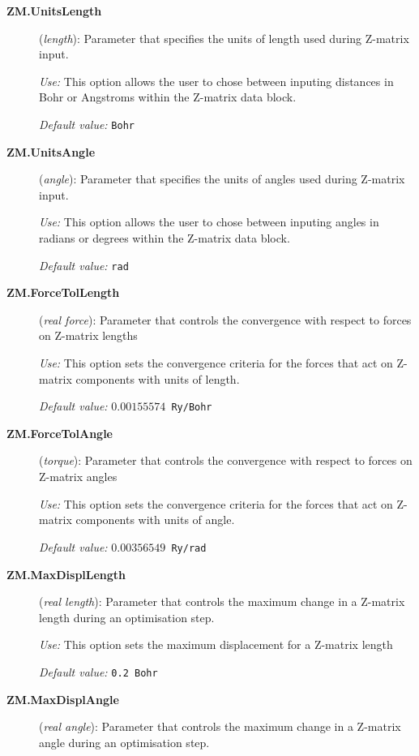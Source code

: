 \documentclass[11pt]{article}
\begin{document}
\begin{description}
\item[{\bf ZM.UnitsLength}] ({\it length}):
Parameter that specifies the units of length used during Z-matrix input.

{\it Use:} This option allows the user to chose between inputing distances
in Bohr or Angstroms within the Z-matrix data block.

{\it Default value:} {\tt Bohr}

\item[{\bf ZM.UnitsAngle}] ({\it angle}):
Parameter that specifies the units of angles used during Z-matrix input.

{\it Use:} This option allows the user to chose between inputing angles
in radians or degrees within the Z-matrix data block.

{\it Default value:} {\tt rad}

\item[{\bf ZM.ForceTolLength}] ({\it real force}):
Parameter that controls the convergence with respect to forces on Z-matrix lengths

{\it Use:} This option sets the convergence criteria for the forces that
act on Z-matrix components with units of length.

{\it Default value:} {\tt $0.00155574$ Ry/Bohr}

\item[{\bf ZM.ForceTolAngle}] ({\it torque}):
Parameter that controls the convergence with respect to forces on Z-matrix angles

{\it Use:} This option sets the convergence criteria for the forces that
act on Z-matrix components with units of angle.

{\it Default value:} {\tt $0.00356549$ Ry/rad}

\item[{\bf ZM.MaxDisplLength}] ({\it real length}):
Parameter that controls the maximum change in a Z-matrix length during an 
optimisation step.

{\it Use:} This option sets the maximum displacement for a Z-matrix length

{\it Default value:} {\tt 0.2 Bohr}

\item[{\bf ZM.MaxDisplAngle}] ({\it real angle}):
Parameter that controls the maximum change in a Z-matrix angle during an 
optimisation step.


\end{description}
\end{document}
